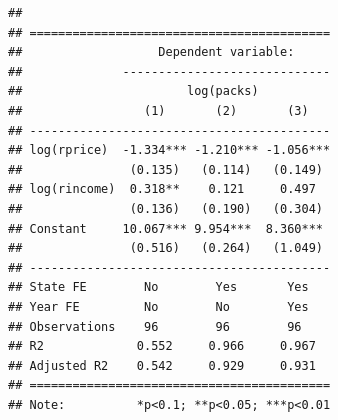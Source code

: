\documentclass[
  12pt,
]{book}
\theoremstyle{definition}
\theoremstyle{definition}
\theoremstyle{definition}
\theoremstyle{definition}
\theoremstyle{remark}
\begin{document}
\begin{verbatim}
## 
## ==========================================
##                   Dependent variable:     
##              -----------------------------
##                       log(packs)          
##                 (1)       (2)       (3)   
## ------------------------------------------
## log(rprice)  -1.334*** -1.210*** -1.056***
##               (0.135)   (0.114)   (0.149) 
## log(rincome)  0.318**    0.121     0.497  
##               (0.136)   (0.190)   (0.304) 
## Constant     10.067*** 9.954***  8.360*** 
##               (0.516)   (0.264)   (1.049) 
## ------------------------------------------
## State FE        No        Yes       Yes   
## Year FE         No        No        Yes   
## Observations    96        96        96    
## R2             0.552     0.966     0.967  
## Adjusted R2    0.542     0.929     0.931  
## ==========================================
## Note:          *p<0.1; **p<0.05; ***p<0.01
\end{verbatim}
\end{document}
